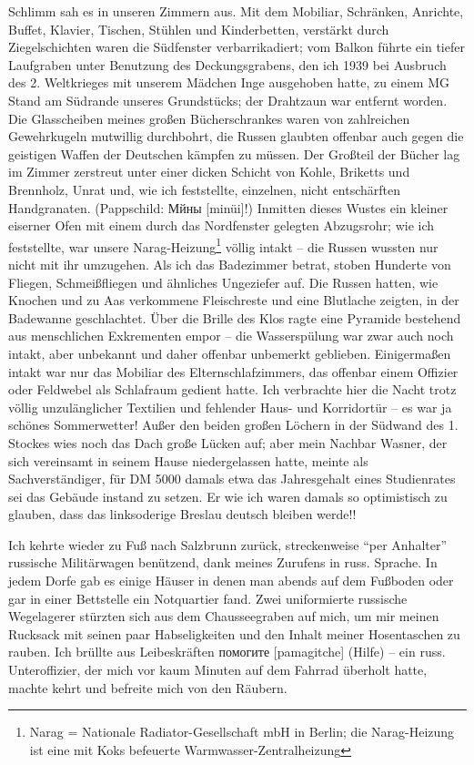  Schlimm sah es in unseren Zimmern aus. Mit dem Mobiliar, Schränken, Anrichte, Buffet, Klavier, Tischen, Stühlen und Kinderbetten, verstärkt durch Ziegelschichten waren die Südfenster verbarrikadiert; vom Balkon führte ein tiefer Laufgraben unter Benutzung des Deckungsgrabens, den ich 1939 bei Ausbruch des 2. Weltkrieges mit unserem Mädchen Inge ausgehoben hatte, zu einem MG Stand am Südrande unseres Grundstücks; der Drahtzaun war entfernt worden. Die Glasscheiben meines großen Bücherschrankes waren von zahlreichen Gewehrkugeln mutwillig durchbohrt, die Russen glaubten offenbar auch gegen die geistigen Waffen der Deutschen kämpfen zu müssen. Der Großteil der Bücher lag im Zimmer zerstreut unter einer dicken Schicht von Kohle, Briketts und Brennholz, Unrat und, wie ich feststellte, einzelnen, nicht entschärften Handgranaten.  (Pappschild: Мйны [minüi]!) Inmitten dieses Wustes ein kleiner eiserner Ofen mit einem durch das Nordfenster gelegten Abzugsrohr; wie ich feststellte, war unsere Narag-Heizung\footnote{Narag = Nationale Radiator-Gesellschaft mbH in Berlin; die Narag-Heizung ist eine mit Koks befeuerte Warmwasser-Zentralheizung} völlig intakt -- die Russen wussten nur nicht mit ihr umzugehen. Als ich das Badezimmer betrat, stoben Hunderte von Fliegen, Schmeißfliegen und ähnliches Ungeziefer auf. Die Russen hatten, wie Knochen und zu Aas verkommene Fleischreste und eine Blutlache zeigten, in der Badewanne geschlachtet. Über die Brille des Klos ragte eine Pyramide bestehend aus menschlichen Exkrementen empor -- die Wasserspülung war zwar auch noch intakt, aber unbekannt und daher offenbar unbemerkt geblieben. Einigermaßen intakt war nur das Mobiliar des Elternschlafzimmers, das offenbar einem Offizier oder Feldwebel als Schlafraum gedient hatte. Ich verbrachte hier die Nacht trotz völlig unzulänglicher Textilien und fehlender Haus- und Korridortür -- es war ja schönes Sommerwetter! Außer den beiden großen Löchern in der Südwand des 1. Stockes wies noch das Dach große Lücken auf; aber mein Nachbar Wasner, der sich  vereinsamt in seinem Hause niedergelassen hatte, meinte als Sachverständiger, für DM 5000 damals etwa das Jahresgehalt eines Studienrates sei das Gebäude instand zu setzen. Er wie ich waren damals so optimistisch zu glauben, dass das linksoderige Breslau deutsch bleiben werde!!

Ich kehrte wieder zu Fuß nach Salzbrunn zurück, streckenweise \enquote{per Anhalter} russische Militärwagen benützend, dank meines Zurufens in russ. Sprache. In jedem Dorfe gab es einige Häuser in denen man abends auf dem Fußboden oder gar in einer Bettstelle ein Notquartier fand. Zwei uniformierte russische Wegelagerer stürzten sich aus dem Chausseegraben auf mich, um mir meinen Rucksack mit seinen paar Habseligkeiten und den Inhalt meiner Hosentaschen zu rauben. Ich brüllte aus Leibeskräften помогите [pamagitche] (Hilfe) -- ein russ. Unteroffizier, der mich vor kaum Minuten auf dem Fahrrad überholt hatte, machte kehrt und befreite mich von den Räubern.

